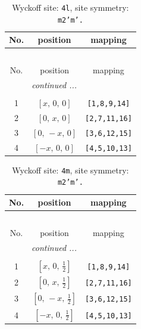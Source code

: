 \documentclass[fleqn,8pt]{jsarticle}
\begin{document}
\renewcommand{\arraystretch}{1.2}
\begin{longtable}{ccc}
\caption{Wyckoff site: {\tt 4l}, site symmetry: {\tt m2'm'.}}
 \\
 \hline \hline
No. & position & mapping \\ \hline \endfirsthead

\multicolumn{2}{l}{\tablename\ \thetable{}} \\
 \hline \hline
No. & position & mapping \\ \hline \endhead

 \hline \hline
\multicolumn{2}{r}{\footnotesize\it continued ...} \\ \endfoot

 \hline \hline
\multicolumn{2}{r}{} \\ \endlastfoot

1 & $\left[ x,\, 0,\, 0 \right]$ & {\tt [1,8,9,14]} \\ \hline
2 & $\left[ 0,\, x,\, 0 \right]$ & {\tt [2,7,11,16]} \\ \hline
3 & $\left[ 0,\, - x,\, 0 \right]$ & {\tt [3,6,12,15]} \\ \hline
4 & $\left[ - x,\, 0,\, 0 \right]$ & {\tt [4,5,10,13]} \\
\end{longtable}
\renewcommand{\arraystretch}{1.2}
\begin{longtable}{ccc}
\caption{Wyckoff site: {\tt 4m}, site symmetry: {\tt m2'm'.}}
 \\
 \hline \hline
No. & position & mapping \\ \hline \endfirsthead

\multicolumn{2}{l}{\tablename\ \thetable{}} \\
 \hline \hline
No. & position & mapping \\ \hline \endhead

 \hline \hline
\multicolumn{2}{r}{\footnotesize\it continued ...} \\ \endfoot

 \hline \hline
\multicolumn{2}{r}{} \\ \endlastfoot

1 & $\left[ x,\, 0,\, \frac{1}{2} \right]$ & {\tt [1,8,9,14]} \\ \hline
2 & $\left[ 0,\, x,\, \frac{1}{2} \right]$ & {\tt [2,7,11,16]} \\ \hline
3 & $\left[ 0,\, - x,\, \frac{1}{2} \right]$ & {\tt [3,6,12,15]} \\ \hline
4 & $\left[ - x,\, 0,\, \frac{1}{2} \right]$ & {\tt [4,5,10,13]} \\
\end{longtable}
\end{document}
